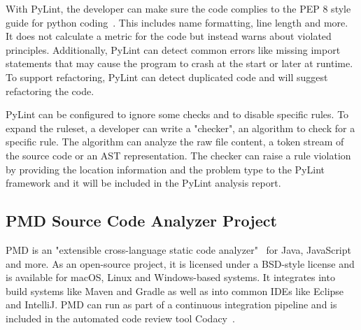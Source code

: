 With PyLint, the developer can make sure the code complies to the PEP 8 style guide for python coding~\cite{pep8}. This includes name formatting, line length and more. It does not calculate a metric for the code but instead warns about violated principles. Additionally, PyLint can detect common errors like missing import statements that may cause the program to crash at the start or later at runtime. To support refactoring, PyLint can detect duplicated code and will suggest refactoring the code.

PyLint can be configured to ignore some checks and to disable specific rules. To expand the ruleset, a developer can write a "checker", an algorithm to check for a specific rule. The algorithm can analyze the raw file content, a token stream of the source code or an AST representation. The checker can raise a rule violation by providing the location information and the problem type to the PyLint framework and it will be included in the PyLint analysis report.

\subsection{PMD Source Code Analyzer Project}
PMD is an "extensible cross-language static code analyzer"~\cite{noauthor_pmd_nodate} for Java, JavaScript and more. As an open-source project, it is licensed under a BSD-style license and is available for macOS, Linux and Windows-based systems. It integrates into build systems like Maven and Gradle as well as into common IDEs like Eclipse and IntelliJ. PMD can run as part of a continuous integration pipeline and is included in the automated code review tool Codacy~\cite{noauthor_codacy_nodate-1}.

